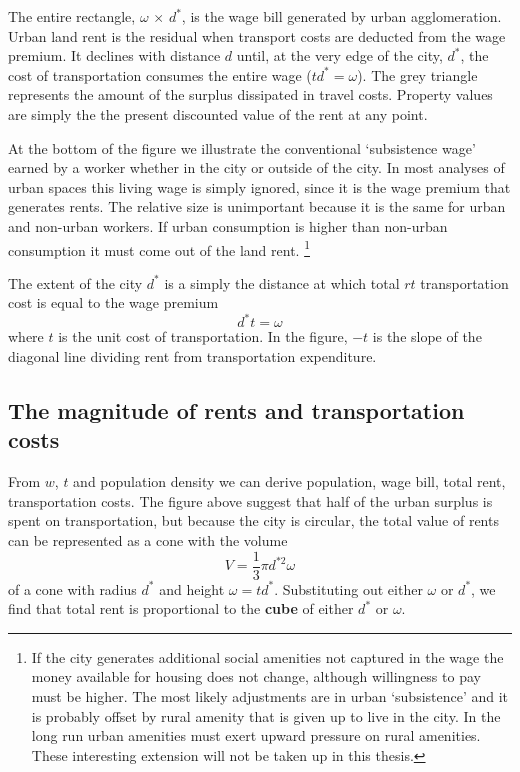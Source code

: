 \begin{figure}
    \begin{center}
    
    \caption{}
    \label{fig-alonzo-simple}
    \end{center}
\end{figure}

The entire rectangle, $\omega$ $\times$ $d^*$, is the wage bill generated by urban agglomeration. Urban land rent is the residual when transport costs are deducted from the wage premium. It declines  with distance $d$ until, at the very edge of the city, $d^*$, the cost of transportation  consumes the entire wage ($td^*=\omega$). The grey triangle represents the amount of the surplus dissipated in travel costs.  Property values are simply the the present discounted value of the rent at any point.

At the bottom of the figure we illustrate the conventional `subsistence wage'  earned by a worker whether in the city or outside of the city.   In most analyses of urban spaces this living wage is simply ignored, since it is the wage premium that generates rents.  The relative size is unimportant because it is the same for urban and non-urban workers. If urban consumption is higher than non-urban consumption it must come out of the land rent.
\footnote{If the city generates additional social amenities not captured in the wage  the money available for housing does not change, although willingness to pay must be higher.  The  most likely adjustments are in urban `subsistence' and it is probably offset by rural amenity that is given up to live in the city. In the long run urban amenities must exert upward pressure on rural amenities. These interesting extension will not be taken up in this thesis. }

The extent  of the city  $d^*$ is a simply the distance at which total $rt$ transportation cost  is equal to the wage premium
\[d^* t= \omega\]
where $t$ is the unit cost of transportation. In the figure, $-t$ is the slope of the diagonal line dividing rent from transportation expenditure.



 \subsection{The magnitude of rents and transportation costs}
 From $w$, $t$ and population density we can derive population, wage bill, total rent, transportation costs. The figure above suggest that  half of the urban surplus is spent on transportation, but because the city is circular, the total value of rents can be represented as  a cone with the volume  \[ V=\frac{1}{3}\pi  d^{*2} \omega \]
of a cone with radius $d^*$ and  height $\omega = td^*$. Substituting out either  $\omega$ or  $d^*$, we find that total rent is  proportional to the \textbf{cube} of either  $d^*$ or $\omega$. 

